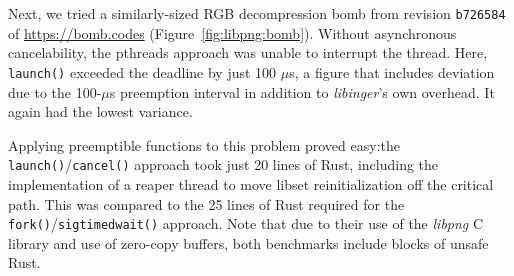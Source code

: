 Next, we tried a similarly-sized RGB decompression bomb from revision
\texttt{b726584} of \url{https://bomb.codes} (Figure~\ref{fig:libpng:bomb}).  Without
asynchronous cancelability, the pthreads approach was unable to interrupt the thread.
Here, \texttt{launch()} exceeded the deadline by just 100
$\mu$s, a figure that includes deviation due to the 100-$\mu$s preemption interval in
addition to \textit{libinger}'s own overhead.  It again had the lowest variance.

Applying preemptible functions to this problem proved easy:\@ the
\texttt{launch()}/\texttt{cancel()} approach took just 20 lines of Rust, including
the implementation of a reaper thread to move libset reinitialization off the
critical path.  This was compared to the 25 lines of Rust required for the
\texttt{fork()}/\texttt{sigtimedwait()} approach.  Note that due to their use of the
\textit{libpng} C library and use of zero-copy buffers, both benchmarks include
blocks of unsafe Rust.
